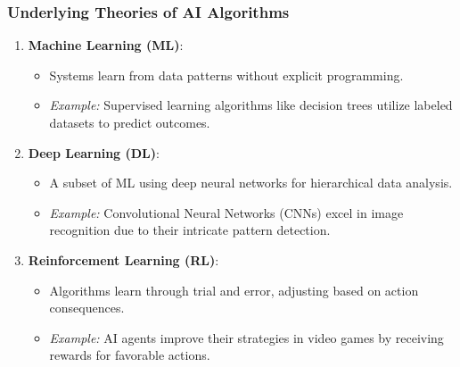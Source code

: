 \documentclass[aspectratio=169]{beamer}
\begin{document}
\begin{frame}
    \frametitle{Underlying Theories of AI Algorithms}
    \begin{enumerate}
        \item \textbf{Machine Learning (ML)}:
            \begin{itemize}
                \item Systems learn from data patterns without explicit programming.
                \item \textit{Example:} Supervised learning algorithms like decision trees utilize labeled datasets to predict outcomes.
            \end{itemize}
        
        \item \textbf{Deep Learning (DL)}:
            \begin{itemize}
                \item A subset of ML using deep neural networks for hierarchical data analysis.
                \item \textit{Example:} Convolutional Neural Networks (CNNs) excel in image recognition due to their intricate pattern detection.
            \end{itemize}

        \item \textbf{Reinforcement Learning (RL)}:
            \begin{itemize}
                \item Algorithms learn through trial and error, adjusting based on action consequences.
                \item \textit{Example:} AI agents improve their strategies in video games by receiving rewards for favorable actions.
            \end{itemize}
    \end{enumerate}
\end{frame}
\end{document}
